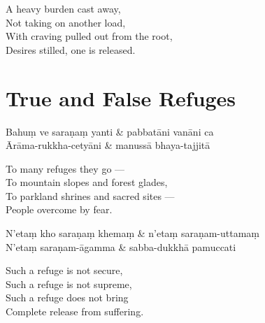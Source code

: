 \begin{english}
  A heavy burden cast away,\\
  Not taking on another load,\\
  With craving pulled out from the root,\\
  Desires stilled, one is released.
\end{english}


\section{True and False Refuges}



\begin{leader}
\end{leader}

\begin{twochants}
  Bahuṃ ve saraṇaṃ yanti & pabbatāni vanāni ca \\
  Ārāma-rukkha-cetyāni & manussā bhaya-tajjitā \\
\end{twochants}

\begin{english}
  To many refuges they go ---\\
  To mountain slopes and forest glades,\\
  To parkland shrines and sacred sites ---\\
  People overcome by fear.
\end{english}

\begin{twochants}
  N'etaṃ kho saraṇaṃ khemaṃ & n'etaṃ saraṇam-uttamaṃ \\
  N'etaṃ saraṇam-āgamma & sabba-dukkhā pamuccati \\
\end{twochants}

\begin{english}
  Such a refuge is not secure,\\
  Such a refuge is not supreme,\\
  Such a refuge does not bring\\
  Complete release from suffering.
\end{english}

